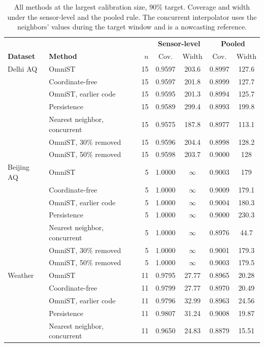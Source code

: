 \begin{table}[htbp]
\caption{All methods at the largest calibration size, 90\% target. Coverage and width under the sensor-level and the pooled rule. The concurrent interpolator uses the neighbors' values during the target window and is a nowcasting reference.}
\label{tab:allmethods}
\centering\small
\begin{tabular}{llrcccc}
\toprule
 & & & \multicolumn{2}{c}{\textbf{Sensor-level}} & \multicolumn{2}{c}{\textbf{Pooled}} \\
\textbf{Dataset} & \textbf{Method} & $n$ & Cov. & Width & Cov. & Width \\
\midrule
Delhi AQ & OmniST & 15 & 0.9597 & 203.6 & 0.8997 & 127.6 \\
 & Coordinate-free & 15 & 0.9597 & 201.8 & 0.8999 & 127.7 \\
 & OmniST, earlier code & 15 & 0.9595 & 201.3 & 0.8994 & 125.7 \\
 & Persistence & 15 & 0.9589 & 299.4 & 0.8993 & 199.8 \\
 & Nearest neighbor, concurrent & 15 & 0.9575 & 187.8 & 0.8977 & 113.1 \\
 & OmniST, 30\% removed & 15 & 0.9596 & 204.4 & 0.8998 & 128.2 \\
 & OmniST, 50\% removed & 15 & 0.9598 & 203.7 & 0.9000 & 128 \\
\midrule
Beijing AQ & OmniST & 5 & 1.0000 & $\infty$ & 0.9003 & 179 \\
 & Coordinate-free & 5 & 1.0000 & $\infty$ & 0.9009 & 179.1 \\
 & OmniST, earlier code & 5 & 1.0000 & $\infty$ & 0.9004 & 180.3 \\
 & Persistence & 5 & 1.0000 & $\infty$ & 0.9000 & 230.3 \\
 & Nearest neighbor, concurrent & 5 & 1.0000 & $\infty$ & 0.8976 & 44.7 \\
 & OmniST, 30\% removed & 5 & 1.0000 & $\infty$ & 0.9001 & 179.3 \\
 & OmniST, 50\% removed & 5 & 1.0000 & $\infty$ & 0.9003 & 179.5 \\
\midrule
Weather & OmniST & 11 & 0.9795 & 27.77 & 0.8965 & 20.28 \\
 & Coordinate-free & 11 & 0.9799 & 27.77 & 0.8970 & 20.49 \\
 & OmniST, earlier code & 11 & 0.9796 & 32.99 & 0.8963 & 24.56 \\
 & Persistence & 11 & 0.9807 & 31.24 & 0.9008 & 19.87 \\
 & Nearest neighbor, concurrent & 11 & 0.9650 & 24.83 & 0.8879 & 15.51 \\

\end{tabular}
\end{table}
